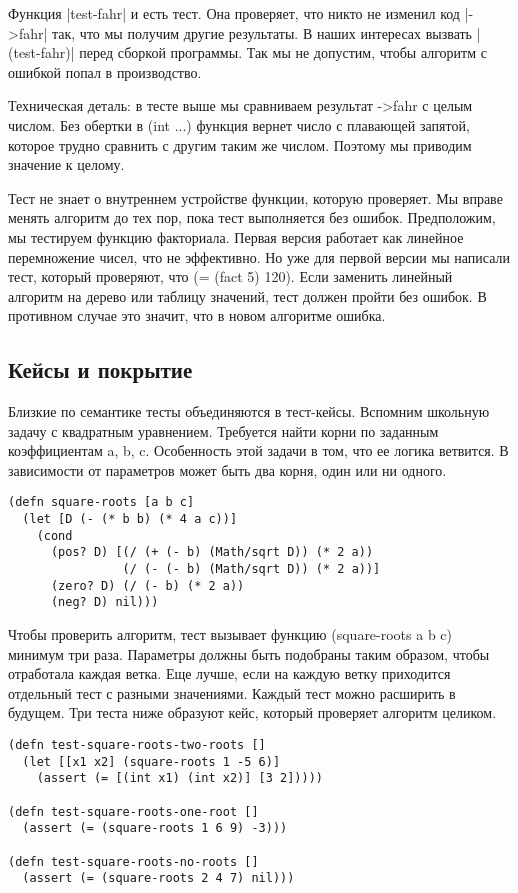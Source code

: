 Функция \spverb|test-fahr| и есть тест. Она проверяет, что никто не изменил код
\spverb|->fahr| так, что мы получим другие результаты. В наших интересах вызвать
\spverb|(test-fahr)| перед сборкой программы. Так мы не допустим, чтобы алгоритм с
ошибкой попал в производство.

Техническая деталь: в тесте выше мы сравниваем результат ->fahr с целым
числом. Без обертки в (int ...) функция вернет число с плавающей запятой,
которое трудно сравнить с другим таким же числом. Поэтому мы приводим значение к
целому.

Тест не знает о внутреннем устройстве функции, которую проверяет. Мы вправе
менять алгоритм до тех пор, пока тест выполняется без ошибок. Предположим, мы
тестируем функцию факториала. Первая версия работает как линейное перемножение
чисел, что не эффективно. Но уже для первой версии мы написали тест, который
проверяют, что (= (fact 5) 120). Если заменить линейный алгоритм на дерево или
таблицу значений, тест должен пройти без ошибок. В противном случае это значит,
что в новом алгоритме ошибка.

\subsection{Кейсы и покрытие}

Близкие по семантике тесты объединяются в тест-кейсы. Вспомним школьную задачу с
квадратным уравнением. Требуется найти корни по заданным коэффициентам a, b,
c. Особенность этой задачи в том, что ее логика ветвится. В зависимости от
параметров может быть два корня, один или ни одного.

\begin{verbatim}
(defn square-roots [a b c]
  (let [D (- (* b b) (* 4 a c))]
    (cond
      (pos? D) [(/ (+ (- b) (Math/sqrt D)) (* 2 a))
                (/ (- (- b) (Math/sqrt D)) (* 2 a))]
      (zero? D) (/ (- b) (* 2 a))
      (neg? D) nil)))
\end{verbatim}

Чтобы проверить алгоритм, тест вызывает функцию (square-roots a b c) минимум три
раза. Параметры должны быть подобраны таким образом, чтобы отработала каждая
ветка. Еще лучше, если на каждую ветку приходится отдельный тест с разными
значениями. Каждый тест можно расширить в будущем. Три теста ниже образуют кейс,
который проверяет алгоритм целиком.

\begin{verbatim}
(defn test-square-roots-two-roots []
  (let [[x1 x2] (square-roots 1 -5 6)]
    (assert (= [(int x1) (int x2)] [3 2]))))

(defn test-square-roots-one-root []
  (assert (= (square-roots 1 6 9) -3)))

(defn test-square-roots-no-roots []
  (assert (= (square-roots 2 4 7) nil)))
\end{verbatim}

